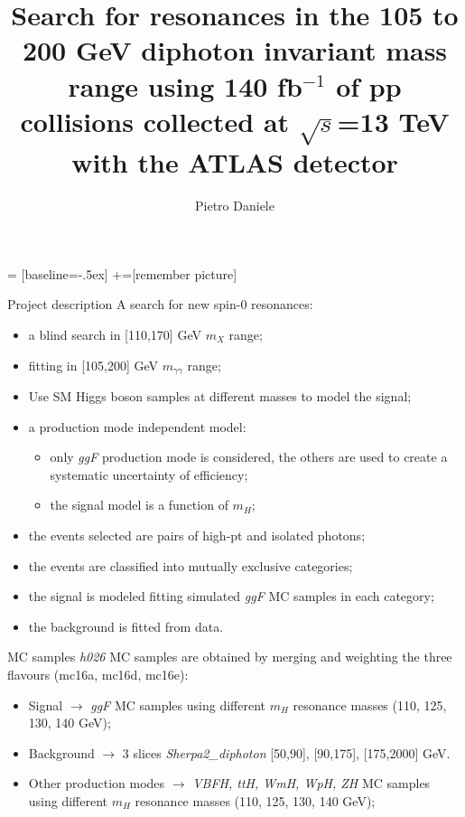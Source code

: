 \documentclass[10pt,UKenglish, leqno, xcolor = dvipsnames]{beamer}
\author{Pietro Daniele}
\title{\large Search for resonances in the 105 to 200 GeV diphoton invariant mass range using 140 fb$^{-1}$ of pp collisions collected at $\sqrt{s}$=13 TeV with the ATLAS detector}
\begin{document}
	 = [baseline=-.5ex]
	+=[remember picture]
	
	\begin{frame}{Project description}
		\vfill
		A search for new spin-0 resonances:
		\begin{itemize}
			\item a blind search in [110,170] GeV $m_{X}$ range;
			\item fitting in [105,200] GeV $m_{\gamma\gamma}$ range;
			\item Use SM Higgs boson samples at different masses to model the signal;
			\item a production mode independent model:
			\begin{itemize}
				\item only \textit{ggF} production mode is considered, the others are used to create a systematic uncertainty of efficiency;
				\item the signal model is a function of $m_H$;
			\end{itemize} 
			\item the events selected are pairs of high-pt and isolated photons; 
			\item the events are classified into mutually exclusive categories;
			\item the signal is modeled fitting simulated \textit{ggF} MC samples in each category;
			\item the background is fitted from data.
		\end{itemize}
		\vfill
	\end{frame}
	
	\begin{frame}{MC samples}
		\vfill
		\textit{h026} MC samples are obtained by merging and weighting the three flavours (mc16a, mc16d, mc16e):
		\begin{itemize}
			\item Signal $\to$ \textit{ggF} MC samples using different $m_H$ resonance masses (110, 125, 130, 140 GeV);
			\item Background $\to$ 3 slices \textit{Sherpa2\_diphoton}  [50,90], [90,175], [175,2000] GeV.
			\item Other production modes $\to$ \textit{VBFH, ttH, WmH, WpH, ZH} MC samples using different $m_H$ resonance masses (110, 125, 130, 140 GeV);
		\end{itemize}
		\vfill
	\end{frame}
	

	
\end{document}
